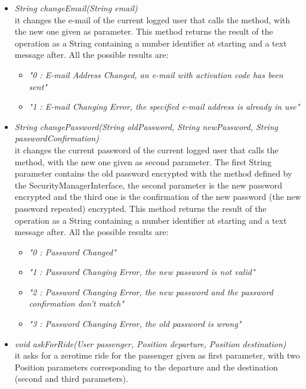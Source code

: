 \documentclass[\mainpath/main]{subfiles}
\begin{document}
\begin{itemize}
\begin{itemize}
		\item \textit{String changeEmail(String email)}\\
		it changes the e-mail of the current logged user that calls the method, with the new one given as parameter. This method returns the result of the operation as a String containing a number identifier at starting and a text message after. All the possible results are:
		\begin{itemize}
			\item \textit{"0 : E-mail Address Changed, an 	e-mail with activation code has been sent"}
			\item \textit{"1 : E-mail Changing Error, the specified e-mail address is already in use"}
		\end{itemize}					

		\item \textit{String changePassword(String oldPassword, String newPassword, String passwordConfirmation)}\\
		it changes the current password of the current logged user that calls the method, with the new one given as second parameter. The first String parameter contains the old password encrypted with the method defined by the SecurityManagerInterface, the second parameter is the new password encrypted and the third one is the confirmation of the new password (the new password repeated) encrypted. This method returns the result of the operation as a String containing a number identifier at starting and a text message after. All the possible results are:
		\begin{itemize}
			\item \textit{"0 : Password Changed"}
			\item \textit{"1 : Password Changing Error, the new password is not valid"}		
			\item \textit{"2 : Password Changing Error, the new password and the password confirmation don't match"}
			\item \textit{"3 : Password Changing Error, the old password is wrong"}		
		\end{itemize}						

		\item \textit{void askForRide(User passenger, Position departure, Position destination)}\\
		it asks for	a zerotime ride for the passenger given as first parameter, with two Position parameters corresponding to the departure and the destination (second and third parameters).


\end{itemize}
\end{itemize}
\end{document}
